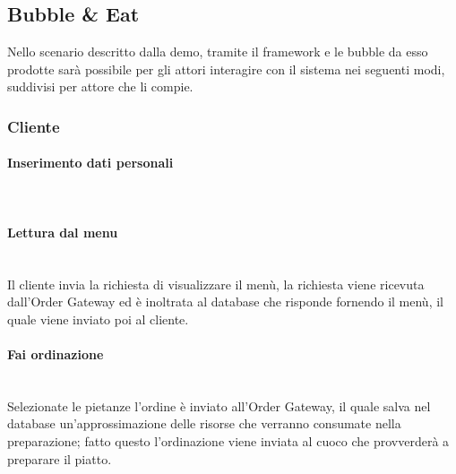 \subsection{Bubble \& Eat}
Nello scenario descritto dalla demo, tramite il framework e le bubble da esso prodotte sarà possibile per gli attori interagire con il sistema nei seguenti modi, suddivisi per attore che li compie.

\subsubsection{Cliente}

\paragraph{Inserimento dati personali}\mbox{}\\

\paragraph{Lettura dal menu}\mbox{}\\
Il cliente invia la richiesta di visualizzare il menù, la richiesta viene ricevuta dall’Order Gateway ed è inoltrata al database che risponde fornendo il menù, il quale viene inviato poi al cliente.

\paragraph{Fai ordinazione}\mbox{}\\
Selezionate le pietanze l'ordine è inviato all’Order Gateway, il quale salva nel database un'approssimazione delle risorse che verranno consumate nella preparazione; fatto questo l'ordinazione viene inviata al cuoco che provverderà a preparare il piatto.

